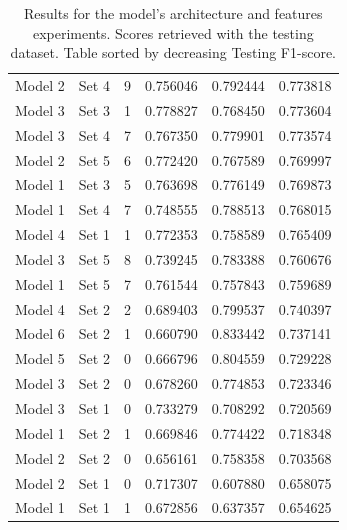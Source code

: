 \begin{table}[!h]
\begin{tabular}{c|c|c|c|c|c}
        Model 2  &	Set 4      &	9	    &	0.756046    &	0.792444    &	0.773818    \\
        Model 3  &	Set 3      &	1	    &	0.778827    &	0.768450    &	0.773604    \\
        Model 3  &	Set 4      &	7	    &	0.767350    &	0.779901    &	0.773574    \\
        Model 2  &	Set 5      &	6	    &	0.772420    &	0.767589    &	0.769997    \\
        Model 1  &	Set 3      &	5	    &	0.763698    &	0.776149    &	0.769873    \\
        Model 1  &	Set 4      &	7	    &	0.748555    &	0.788513    &	0.768015    \\
        Model 4  &	Set 1      &	1	    &	0.772353    &	0.758589    &	0.765409    \\
        Model 3  &	Set 5      &	8	    &	0.739245    &	0.783388    &	0.760676    \\
        Model 1  &	Set 5      &	7	    &	0.761544    &	0.757843    &	0.759689    \\
        Model 4  &	Set 2      &	2	    &	0.689403    &	0.799537    &	0.740397    \\
        Model 6  &	Set 2      &	1	    &	0.660790    &	0.833442    &	0.737141    \\
        Model 5  &	Set 2      &	0	    &	0.666796    &	0.804559    &	0.729228    \\
        Model 3  &	Set 2      &	0	    &	0.678260    &	0.774853    &	0.723346    \\
        Model 3  &	Set 1      &	0	    &	0.733279    &	0.708292    &	0.720569    \\
        Model 1  &	Set 2      &	1	    &	0.669846    &	0.774422    &	0.718348    \\
        Model 2  &	Set 2      &	0	    &	0.656161    &	0.758358    &	0.703568    \\
        Model 2  &	Set 1      &	0	    &	0.717307    &	0.607880    &	0.658075    \\
        Model 1  &	Set 1      &	1	    &	0.672856    &	0.637357    &	0.654625    \\
    \end{tabular}
    \caption{Results for the model's architecture and features experiments. Scores retrieved with the testing dataset. Table sorted by decreasing Testing F1-score.}
    \label{tab-annex:nn-experiments}
\end{table}




